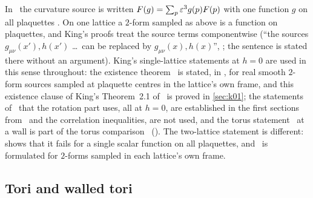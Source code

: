 \begin{remark}\label{rot:rem:frame}
In~\cite{K1,K2} the curvature source is written $F(g)=\sum_p\varepsilon^3g(p)F(p)$ with one function $g$ on all plaquettes \cite[(2.12)]{K2}. On one lattice a $2$-form sampled as above is a function on plaquettes, and King's proofs treat the source terms componentwise (``the sources $g_{\mu\nu}(x'),h(x')$ \dots\ can be replaced by $g_{\mu\nu}(x),h(x)$'', \cite[p.~665]{K1}; the sentence is stated there without an argument). King's single-lattice statements at $h=0$ are used in this sense throughout: the existence theorem \EC\ is stated, in , for real smooth $2$-form sources sampled at plaquette centres in the lattice's own frame, and this existence clause of King's Theorem~2.1 of~\cite{K2} is proved in \cref{sec:k01}; the statements of~\cite[Thms.~2.2, 2.3, (3.40)--(3.44)]{K2} that the rotation part uses, all at $h=0$, are established in the first sections from \EC\ and the correlation inequalities, \cite[(3.42)--(3.43)]{K2} are not used, and the torus statement~\cite[Thm.~2.1]{K1} at a wall is part of the torus comparison \Kz\ (). The two-lattice statement is different:  shows that it fails for a single scalar function on all plaquettes, and \Kz\ is formulated for $2$-forms sampled in each lattice's own frame.
\end{remark}

\subsection{Tori and walled tori}

